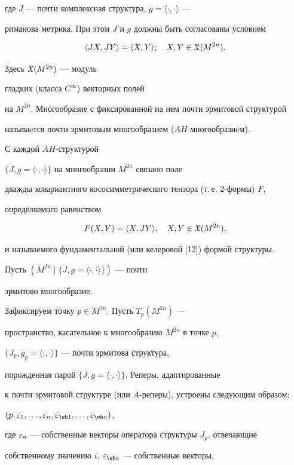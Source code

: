 где $J$ --- почти комплексная структура, $g=\langle \cdot,\cdot \rangle$ ---


риманова метрика. При этом $J$ и $g$ должны быть согласованы условием 


$$


\langle JX, JY\rangle=\langle X, Y\rangle;\quad X,Y \in\frak X(M^{2n}).


$$


Здесь $\frak X(M^{2n})$ --- модуль 


гладких (класса $C^{\infty}$) векторных полей


на $M^{2n}$. Многообразие с фиксированной на нем почти эрмитовой структурой


называeтся почти эрмитовым многообразием ($AH$-многообразиeм).


С каждой $AH$-структурой 


$\{J, g=\langle\cdot,\cdot\rangle\}$ на многообразии $M^{2n}$ связано поле


дважды ковариантного кососимметрического тензора (т.\,е. 2-формы) $F$,


определяемого равенством 


$$


F(X, Y)=\langle X, JY\rangle,\quad X,Y\in\frak X(M^{2n}),


$$


и называемого фундаментальной (или келеровой [12]) формой структуры.





Пусть $(M^{2n}\mid\{J, g=\langle\cdot,\cdot\rangle\})$ --- почти


эрмитово многообразие. 


Зафиксируем точку $p\in M^{2n}$. Пусть $T_p(M^{2n})$ ---


пространство, касательное к многообразию $M^{2n}$ в точке $p$,


$\{J_p, g_p=\langle\cdot,\cdot\rangle\}$ --- почти эрмитова структура,


порожденная парой $\{J, g{=}\langle\cdot,\cdot\rangle\}$. Реперы, адаптированные


к почти эрмитовой структуре (или $A$-реперы), устроены следующим образом:


$(p,\ep_1,\dotsc,\ep_n, \ep_{\wh 1},\ldots,\ep_{\wh n})$,


где $\varepsilon_a$ --- собственные векторы оператора структуры $J_p$, отвечающие


собственному значению $i$, $\ep_{\wh a}$ --- собственные векторы,


